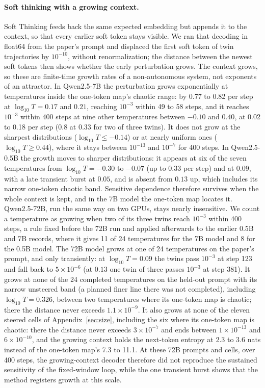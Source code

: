 \documentclass[11pt,letterpaper]{article}
\begin{document}
\paragraph{Soft thinking with a growing context.} Soft Thinking \cite{zhang2025softthinking} feeds back the same
expected embedding but appends it to the context, so that every earlier soft token stays visible. We ran that
decoding in float64 from the paper's prompt and displaced the first soft token of twin trajectories by $10^{-10}$,
without renormalization; the distance between the newest soft tokens then shows whether the early perturbation grows.
The context grows, so these are finite-time growth rates of a non-autonomous system, not exponents of an attractor.
In Qwen2.5-7B the perturbation grows exponentially at temperatures inside the one-token map's chaotic range: by 0.77
to 0.82 per step at $\log_{10}T=0.17$ and $0.21$, reaching $10^{-3}$ within 49 to 58 steps, and it reaches $10^{-3}$
within 400 steps at nine other temperatures between $-0.10$ and $0.40$, at 0.02 to 0.18 per step (0.8 at $0.33$ for two
of three twins). It does not grow at the sharpest distributions
($\log_{10}T\le-0.14$) or at nearly uniform ones ($\log_{10}T\ge0.44$), where it stays between $10^{-13}$ and
$10^{-7}$ for 400 steps. In Qwen2.5-0.5B the growth moves to sharper distributions: it appears at six of the seven temperatures from
$\log_{10}T=-0.30$ to $-0.07$ (up to 0.33 per step) and at $0.09$, with a late transient burst at $0.05$, and is absent
from $0.13$ up, which includes its narrow one-token chaotic band. Sensitive
dependence therefore survives when the whole context is kept, and in the 7B model the one-token map locates it.
Qwen2.5-72B, run the same way on two GPUs, stays nearly insensitive. We count a temperature as growing when two of its three
twins reach $10^{-3}$ within 400 steps, a rule fixed before the 72B run and applied afterwards to the earlier 0.5B
and 7B records, where it gives 11 of 24 temperatures for the 7B model and 8 for the 0.5B model. The 72B model grows at one of 24 temperatures on the paper's prompt, and only
transiently: at $\log_{10}T=0.09$ the twins pass $10^{-3}$ at step 123 and fall back to $5\times10^{-6}$ (at $0.13$ one twin of three passes
$10^{-3}$ at step 381). It grows at
none of the 24 completed temperatures on the held-out prompt with its narrow unsteered band (a planned finer line there
was not completed), including $\log_{10}T=0.326$, between two temperatures
where its one-token map is chaotic; there the distance never exceeds $1.1\times10^{-9}$. It also grows at none of the
eleven steered cells of Appendix~\ref{sec:size}, including the six where its one-token map is chaotic: there the
distance never exceeds $3\times10^{-7}$ and ends between $1\times10^{-13}$ and $6\times10^{-10}$, and the growing
context holds the next-token entropy at 2.3 to 3.6 nats instead of the one-token map's 7.3 to 11.1. At these 72B
prompts and cells, over 400 steps, the growing-context decoder therefore did not reproduce the sustained sensitivity of
the fixed-window loop, while the one transient burst shows that the method registers growth at this scale.
\end{document}
